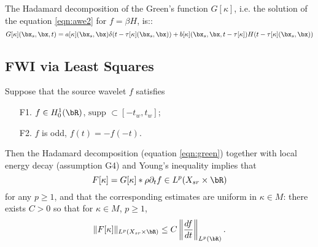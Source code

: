 The Hadamard
decomposition of the Green's function $G[\kappa]$, i.e. the solution of the
equation \ref{eqn:awe2} for $f = \beta H$, is::
\begin{equation}
  \label{eqn:green}
  G[\kappa](\bx_s,\bx,t) = a[\kappa](\bx_s,\bx)\delta(t - \tau[\kappa](\bx_s,\bx)) +
  b[\kappa](\bx_s,\bx,t-\tau[\kappa])H(t - \tau[\kappa](\bx_s,\bx))
\end{equation}

\subsection{FWI via Least Squares}
Suppose that the source wavelet $f$ satisfies
\begin{itemize}
\item[F1. ] $f \in H^1_0(\bR)$, $\mbox{supp } \subset [-t_w,t_w]$;
\item[F2. ] $f$ is odd, $f(t) = -f(-t)$.
\end{itemize}
Then the Hadamard decomposition 
(equation \ref{eqn:green}) together with local
energy decay (assumption G4) and Young's inequality  implies that
\begin{equation}
  \label{eqn:fwdgreen}
  F[\kappa] = G[\kappa] * \rho \partial_t f \in L^p(X_{sr} \times \bR)
\end{equation}
for any $p \ge 1$, and that
the corresponding estimates are uniform in $\kappa \in M$:
there exists $C>0$ so that for $\kappa\in M$, $p \ge 1$,
\begin{equation}
  \label{eqn:fwdnorm}
  \|F[\kappa]\|_{L^p(X_{sr} \times \bR)} \le C \left\|\frac{df}{dt}\right\|_{L^p(\bR)}.
\end{equation}

